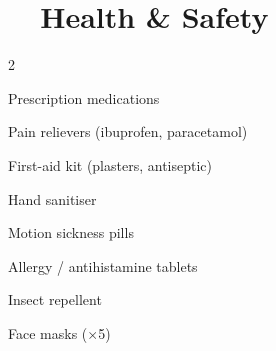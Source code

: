 \section{\faHeart\ \ Health \& Safety}

\begin{multicols}{2}
\begin{checklist}
  \item Prescription medications
  \item Pain relievers (ibuprofen, paracetamol)
  \item First-aid kit (plasters, antiseptic)
  \item Hand sanitiser
  \item Motion sickness pills
  \item Allergy / antihistamine tablets
  \item Insect repellent
  \item Face masks ($\times$5)
\end{checklist}
\end{multicols}

